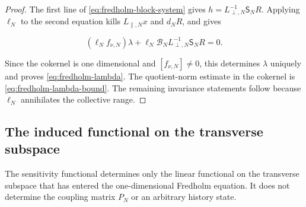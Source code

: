 \begin{proof}
The first line of \eqref{eq:fredholm-block-system} gives
\(h=L_{\perp,N}^{-1}\mathsf S_NR\).  Applying \(\ell_N\) to the second
equation kills \(L_{\parallel,N}x\) and \(d_NR\), and gives

\[
 (\ell_Nf_{\nu,N})\lambda
 +\ell_N\mathcal B_NL_{\perp,N}^{-1}\mathsf S_NR=0.
\]

Since the cokernel is one dimensional and
\([f_{\nu,N}]\ne0\), this determines \(\lambda\) uniquely and proves
\cref{eq:fredholm-lambda}.  The quotient-norm estimate in the cokernel is
\cref{eq:fredholm-lambda-bound}.  The remaining invariance statements
follow because \(\ell_N\) annihilates the collective range.
\end{proof}

\subsection{The induced functional on the transverse subspace}

The sensitivity functional determines only the linear functional on the
transverse subspace that has entered the one-dimensional Fredholm equation.
It does not determine
the coupling matrix \(P_N\) or an arbitrary history state.

